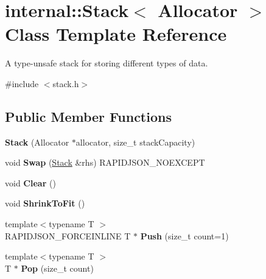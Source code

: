 \hypertarget{classinternal_1_1_stack}{}\section{internal\+:\+:Stack$<$ Allocator $>$ Class Template Reference}
\label{classinternal_1_1_stack}


A type-\/unsafe stack for storing different types of data.  




{\ttfamily \#include $<$stack.\+h$>$}

\subsection*{Public Member Functions}
\begin{DoxyCompactItemize}
\item 
{\bfseries Stack} (Allocator $\ast$allocator, size\+\_\+t stack\+Capacity)\hypertarget{classinternal_1_1_stack_af09ab91f9e5143deccf7c9af837f451e}{}\label{classinternal_1_1_stack_af09ab91f9e5143deccf7c9af837f451e}

\item 
void {\bfseries Swap} (\hyperlink{classinternal_1_1_stack}{Stack} \&rhs) R\+A\+P\+I\+D\+J\+S\+O\+N\+\_\+\+N\+O\+E\+X\+C\+E\+PT\hypertarget{classinternal_1_1_stack_a5e601199a21d84b1ac612f558be0f2c3}{}\label{classinternal_1_1_stack_a5e601199a21d84b1ac612f558be0f2c3}

\item 
void {\bfseries Clear} ()\hypertarget{classinternal_1_1_stack_a02da31665a372738e81ded2f7b7d598e}{}\label{classinternal_1_1_stack_a02da31665a372738e81ded2f7b7d598e}

\item 
void {\bfseries Shrink\+To\+Fit} ()\hypertarget{classinternal_1_1_stack_a3852b8494d69c91f6a238a51572e591e}{}\label{classinternal_1_1_stack_a3852b8494d69c91f6a238a51572e591e}

\item 
{\footnotesize template$<$typename T $>$ }\\R\+A\+P\+I\+D\+J\+S\+O\+N\+\_\+\+F\+O\+R\+C\+E\+I\+N\+L\+I\+NE T $\ast$ {\bfseries Push} (size\+\_\+t count=1)\hypertarget{classinternal_1_1_stack_a8038223ec0ed6ea92bb5f48e645a25ca}{}\label{classinternal_1_1_stack_a8038223ec0ed6ea92bb5f48e645a25ca}

\item 
{\footnotesize template$<$typename T $>$ }\\T $\ast$ {\bfseries Pop} (size\+\_\+t count)\hypertarget{classinternal_1_1_stack_a8545a8ccba595ac6e4ade9784474aa1c}{}\label{classinternal_1_1_stack_a8545a8ccba595ac6e4ade9784474aa1c}


\end{DoxyCompactItemize}
